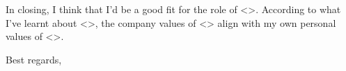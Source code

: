 \documentclass[12pt,a4paper,sans]{moderncv}        %
\begin{document}
In closing, I think that I'd be a good fit for the role of <>. According to what I've learnt about <>, the company values of <> align with my own personal values of <>. 

Best regards,
\makeletterclosing

\end{document}
